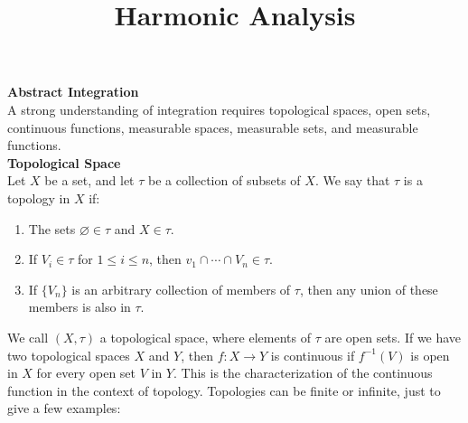 \documentclass[12pt]{article}
\title{Harmonic Analysis}
\let\emptyset\varnothing
\begin{document}
\noindent \textbf{Abstract Integration} \\

\noindent A strong understanding of integration requires topological spaces, open sets, continuous functions, measurable spaces, measurable sets, and measurable functions. \\

\noindent \textbf{Topological Space} \\
\noindent Let $X$ be a set, and let $\tau$ be a collection of subsets of $X$. We say that $\tau$ is a topology in $X$ if:
\begin{enumerate}[itemsep=0pt, parsep=0pt, topsep=0pt, partopsep=0pt]
\item The sets $\emptyset \in \tau$ and $X \in \tau$. 
\item If $V_i \in \tau$ for $1 \leq i \leq n$, then $v_1 \cap \cdots \cap V_n \in \tau$. 
\item If $\{V_n\}$ is an arbitrary collection of members of $\tau$, then any union of these members is also in $\tau$.
\end{enumerate}
\noindent We call $(X, \tau)$ a topological space, where elements of $\tau$ are open sets. If we have two topological spaces $X$ and $Y$, then $f:X\rightarrow Y$ is continuous if $f^{-1}(V)$ is open in $X$ for every open set $V$ in $Y$. This is the characterization of the continuous function in the context of topology. Topologies can be finite or infinite, just to give a few examples:  \\
\end{document}
